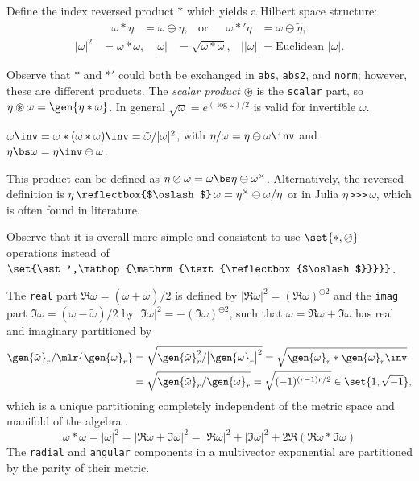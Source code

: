 \documentclass{juliacon}
\DeclareMathOperator*{\obackslash}{\text{\reflectbox{$\oslash$}}}
\begin{document}
\begin{definition}
	Define the index reversed product $\ast$ which yields a Hilbert space structure:
	\begin{align*}
		\omega\ast\eta &= \tilde\omega\ominus\eta, & \text{or} & & \omega\ast'\eta &= \omega\ominus\tilde\eta,
	\end{align*}
	\begin{align*}
		|\omega|^2 &= \omega\ast\omega, & |\omega| &= \sqrt{\omega\ast\omega}, & ||\omega|| = \text{Euclidean }|\omega|.
	\end{align*}
\end{definition}
\begin{remark}
	Observe that $\ast$ and $\ast'$ could both be exchanged in \verb`abs`, \verb`abs2`, and \verb`norm`; however, these are different products.
	The \textit{scalar product} $\circledast$ is the \verb`scalar` part, so $\eta\circledast\omega = \gen{\eta\ast\omega}$.
	In general $\sqrt\omega = e^{(\log\omega)/2}$ is valid for invertible $\omega$.
\end{remark}
\begin{definition}[Inverse]
	$\omega\inv = \omega\ast(\omega\ast\omega)\inv = \tilde\omega/|\omega|^2$, with $\eta/\omega = \eta\ominus\omega\inv$ and %
	$\eta\bs\omega = \eta\inv\ominus\omega$.
\end{definition}
\begin{definition}
	This product can be defined as $\eta\oslash\omega = \omega\bs\eta\ominus\omega^\times$. Alternatively, the reversed definition is $\eta\obackslash\omega = \eta^\times\ominus\omega/\eta$ or in Julia $\eta\,$\verb`>>>`$\,\omega$, which is often found in literature.
\end{definition}
\begin{remark}
	Observe that it is overall more simple and consistent to use $\set{\ast,\oslash}$ operations instead of $\set{\ast',\obackslash}$.
\end{remark}
The \verb`real` part $\Re\omega = (\omega+\tilde\omega)/2$ is defined by $|\Re\omega|^2 = (\Re\omega)^{\ominus2}$ and the \verb`imag` part $\Im\omega = (\omega-\tilde\omega)/2$ by $|\Im\omega|^2 = -(\Im\omega)^{\ominus2}$, such that $\omega = \Re\omega+\Im\omega$ has real and imaginary partitioned by
\begin{align*}
	\gen{\tilde\omega}_r/\mlr{\gen{\omega}_r} &= \sqrt{\gen{\tilde\omega}_r^2/\big|\gen{\omega}_r\big|^2} = \sqrt{\gen{\omega}_r\ast\gen{\omega}_r\inv} \\
	&= \sqrt{\gen{\tilde\omega}_r/\gen{\omega}_r}=\sqrt{(-1)^{(r-1)r/2}} \in\set{1,\sqrt{-1}},
\end{align*}
which is a unique partitioning completely independent of the metric space and manifold of the algebra \cite{chappell-iqbal-gunn-abbott}.
$$ \omega\ast\omega = |\omega|^2 = |\Re\omega+\Im\omega|^2 = %
|\Re\omega|^2+|\Im\omega|^2 + 2\Re(\Re\omega\ast\Im\omega) $$
The \verb`radial` and \verb`angular` components in a multivector exponential are partitioned by the parity of their metric.
\end{document}
